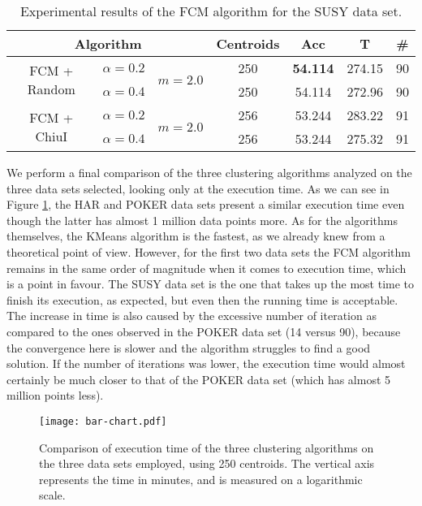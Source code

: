 \begin{table}[h!]
\centering
\caption{Experimental results of the FCM algorithm for the SUSY data set.}
\label{tab:susy2}
\begin{tabular}{ccccccc}
\toprule
\multicolumn{3}{c}{Algorithm} & Centroids & Acc & T & \#\\ \midrule
 \multirow{2}{*}{FCM + Random} & $\alpha = 0.2$ & \multirow{2}{*}{$m=2.0$} & 250 & \textbf{54.114} & 274.15 & 90\\
& $\alpha=0.4$ &  & 250 & 54.114 & 272.96 & 90\\
\multirow{2}{*}{FCM + ChiuI} & $\alpha = 0.2$ & \multirow{2}{*}{$m=2.0$} & 256 & 53.244 & 283.22 & 91\\
& $\alpha=0.4$ &  & 256 & 53.244 & 275.32 & 91\\ \bottomrule
\end{tabular}
\end{table}

We perform a final comparison of the three clustering algorithms analyzed on the three data sets selected, looking only at the execution time. As we can see in Figure \ref{fig:bar-chart}, the HAR and POKER data sets present a similar execution time even though the latter has almost 1 million data points more. As for the algorithms themselves, the KMeans algorithm is the fastest, as we already knew from a theoretical point of view. However, for the first two data sets the FCM algorithm remains in the same order of magnitude when it comes to execution time, which is a point in favour. The SUSY data set is the one that takes up the most time to finish its execution, as expected, but even then the running time is acceptable. The increase in time is also caused by the excessive number of iteration as compared to the ones observed in the POKER data set (14 versus 90), because the convergence here is slower and the algorithm struggles to find a good solution. If the number of iterations was lower, the execution time would almost certainly be much closer to that of the POKER data set (which has almost 5 million points less).

\begin{figure}[h!]
\centering
\texttt{[image: bar-chart.pdf]}
\caption{Comparison of execution time of the three clustering algorithms on the three data sets employed, using 250 centroids. The vertical axis represents the time in minutes, and is measured on a logarithmic scale.}
\label{fig:bar-chart}
\end{figure}

